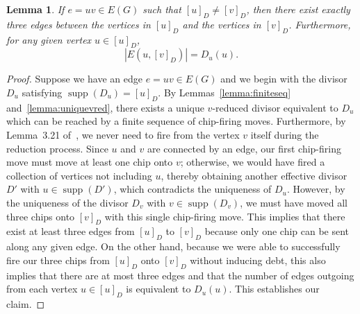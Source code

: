 \documentclass[10pt]{amsart}
\newtheorem{lemma}[theorem]{Lemma}
\DeclareMathOperator{\supp}{supp}
\begin{document}
\begin{lemma}
\label{lemma:threeedges}
If $e = uv \in E(G)$ such that $[u]_D \neq [v]_D$, then there exist exactly three edges between the vertices in $[u]_D$ and the vertices in $[v]_D$. Furthermore, for any given vertex $u \in [u]_D$, 
\[
| E(u, [v]_D) | = D_u(u).
\]
\end{lemma}


\begin{proof}
Suppose we have an edge $e = uv \in E(G)$ and we begin with the divisor $D_u$ satisfying $\supp (D_u) = [u]_D$. By Lemmas~\ref{lemma:finiteseq} and~\ref{lemma:uniquevred}, there exists a unique $v$-reduced divisor equivalent to $D_u$ which can be reached by a finite sequence of chip-firing moves. Furthermore, by Lemma~3.21 of~\cite{db}, we never need to fire from the vertex $v$ itself during the reduction process. Since $u$ and $v$ are connected by an edge, our first chip-firing move must move at least one chip onto $v$; otherwise, we would have fired a collection of vertices not including $u$, thereby obtaining another effective divisor $D'$ with $u\in\supp (D')$, which contradicts the uniqueness of $D_u$. However, by the uniqueness of the divisor $D_v$ with $v \in \supp (D_v)$, we must have moved all three chips onto $[v]_D$ with this single chip-firing move. This implies that there exist at least three edges from $[u]_D$ to $[v]_D$ because only one chip can be sent along any given edge. On the other hand, because we were able to successfully fire our three chips from $[u]_D$ onto $[v]_D$ without inducing debt, this also implies that there are at most three edges and that the number of edges outgoing from each vertex $u \in [u]_D$ is equivalent to $D_u(u)$. This establishes our claim.
\end{proof}
\end{document}
